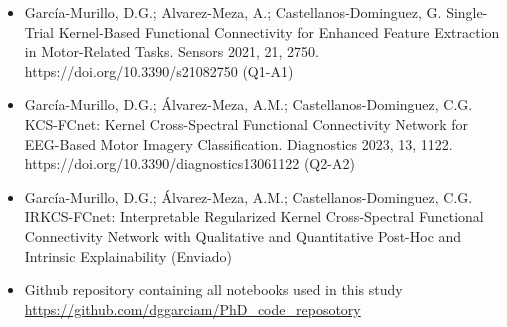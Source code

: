 \begin{itemize}
    \item García-Murillo, D.G.; Alvarez-Meza, A.; Castellanos-Dominguez, G. Single-Trial Kernel-Based Functional Connectivity for Enhanced Feature Extraction in Motor-Related Tasks. Sensors 2021, 21, 2750. https://doi.org/10.3390/s21082750 (Q1-A1)
    
    \item García-Murillo, D.G.; Álvarez-Meza, A.M.; Castellanos-Dominguez, C.G. KCS-FCnet: Kernel Cross-Spectral Functional Connectivity Network for EEG-Based Motor Imagery Classification. Diagnostics 2023, 13, 1122. https://doi.org/10.3390/diagnostics13061122 (Q2-A2)

    \item García-Murillo, D.G.; Álvarez-Meza, A.M.; Castellanos-Dominguez, C.G. IRKCS-FCnet: Interpretable Regularized Kernel Cross-Spectral Functional Connectivity Network with Qualitative and Quantitative Post-Hoc and Intrinsic Explainability (Enviado)

    \item Github repository containing all notebooks used in this study  \url{https://github.com/dggarciam/PhD_code_reposotory}

\end{itemize}